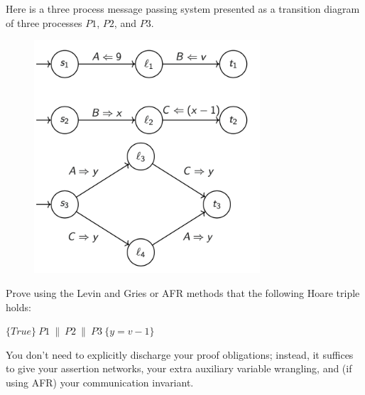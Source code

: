 \documentclass{article}
\begin{document}
\setcounter{question}{0}

\begin{Question} 
    Here is a three process message passing system presented as a transition diagram of three processes $P1$, $P2$, and $P3$.
\begin{figure}[H]
    \centering 
    \includegraphics[width=0.75\textwidth]{DV_demand1}
\end{figure}
Prove using the Levin and Gries or AFR methods that the following Hoare triple holds:
\begin{center}
    $\{True\}\ P1\ \|\ P2\ \|\ P3\ \{y=v-1\}$
\end{center}
You don't need to explicitly discharge your proof obligations; instead, it suffices to give your assertion networks, your extra auxiliary variable wrangling, and (if using AFR) your communication invariant.
    

\end{Question}
\end{document}
